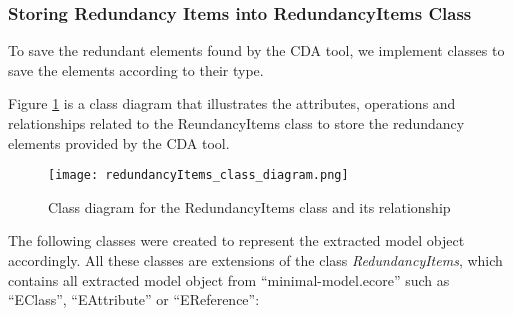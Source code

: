 \subsubsection*{Storing Redundancy Items into RedundancyItems Class}
To save the redundant elements found by the CDA tool, we implement classes to save the elements according to their type.

Figure \ref{fig:redundancyItems_class_diagram} is a class diagram that illustrates the attributes, operations and relationships related to the ReundancyItems class to store the redundancy elements provided by the CDA tool.
\begin{figure}[h]
	\centering 
	\texttt{[image: redundancyItems\_class\_diagram.png]}
	\caption{Class diagram for the RedundancyItems class and its relationship}\label{fig:redundancyItems_class_diagram}
\end{figure} 
The following classes were created to represent the extracted model object accordingly. All these classes are extensions of the class \textit{RedundancyItems}, which contains all extracted model object from \enquote{minimal-model.ecore} such as \enquote{EClass}, \enquote{EAttribute} or \enquote{EReference}:

